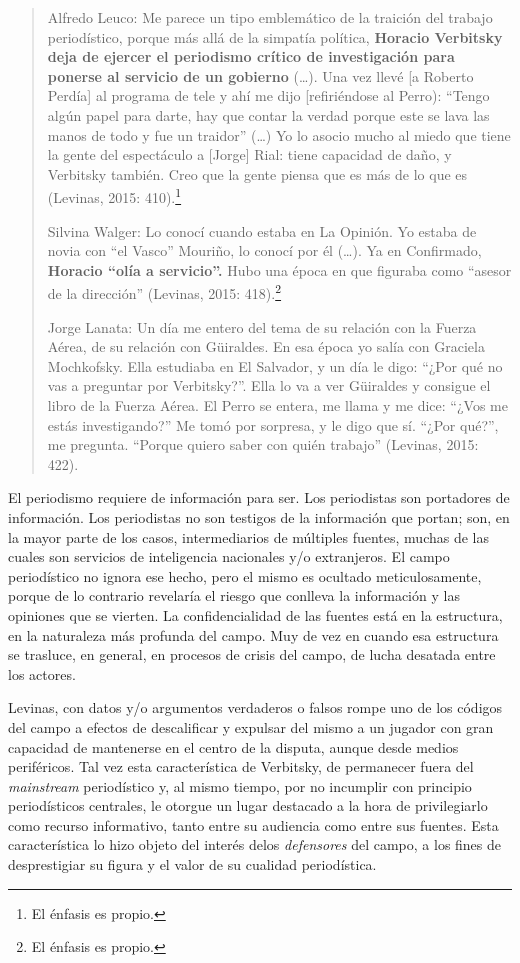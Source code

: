\begin{quote}
Alfredo Leuco: Me parece un tipo emblemático de la traición del trabajo periodístico, porque más allá de la simpatía política, \textbf{Horacio Verbitsky deja de ejercer el periodismo crítico de investigación para ponerse al servicio de un gobierno} (\ldots). Una vez llevé {[}a Roberto Perdía{]} al programa de tele y ahí me dijo {[}refiriéndose al Perro): \enquote{Tengo algún papel para darte, hay que contar la verdad porque este se lava las manos de todo y fue un traidor} (\ldots) Yo lo asocio mucho al miedo que tiene la gente del espectáculo a {[}Jorge{]} Rial: tiene capacidad de daño, y Verbitsky también. Creo que la gente piensa que es más de lo que es (Levinas, 2015: 410).\footnote{El énfasis es propio.}

Silvina Walger: Lo conocí cuando estaba en La Opinión. Yo estaba de novia con \enquote{el Vasco} Mouriño, lo conocí por él (\ldots). Ya en Confirmado, \textbf{Horacio \enquote{olía a servicio}.} Hubo una época en que figuraba como \enquote{asesor de la dirección} (Levinas, 2015: 418).\footnote{El énfasis es propio.}

Jorge Lanata: Un día me entero del tema de su relación con la Fuerza Aérea, de su relación con Güiraldes. En esa época yo salía con Graciela Mochkofsky. Ella estudiaba en El Salvador, y un día le digo: \enquote{¿Por qué no vas a preguntar por Verbitsky?}. Ella lo va a ver Güiraldes y consigue el libro de la Fuerza Aérea. El Perro se entera, me llama y me dice: \enquote{¿Vos me estás investigando?} Me tomó por sorpresa, y le digo que sí. \enquote{¿Por qué?}, me pregunta. \enquote{Porque quiero saber con quién trabajo} (Levinas, 2015: 422).
\end{quote}

El periodismo requiere de información para ser. Los periodistas son portadores de información. Los periodistas no son testigos de la información que portan; son, en la mayor parte de los casos, intermediarios de múltiples fuentes, muchas de las cuales son servicios de inteligencia nacionales y/o extranjeros. El campo periodístico no ignora ese hecho, pero el mismo es ocultado meticulosamente, porque de lo contrario revelaría el riesgo que conlleva la información y las opiniones que se vierten. La confidencialidad de las fuentes está en la estructura, en la naturaleza más profunda del campo. Muy de vez en cuando esa estructura se trasluce, en general, en procesos de crisis del campo, de lucha desatada entre los actores.

Levinas, con datos y/o argumentos verdaderos o falsos rompe uno de los códigos del campo a efectos de descalificar y expulsar del mismo a un jugador con gran capacidad de mantenerse en el centro de la disputa, aunque desde medios periféricos. Tal vez esta característica de Verbitsky, de permanecer fuera del \emph{mainstream} periodístico y, al mismo tiempo, por no incumplir con principio periodísticos centrales, le otorgue un lugar destacado a la hora de privilegiarlo como recurso informativo, tanto entre su audiencia como entre sus fuentes. Esta característica lo hizo objeto del interés delos \emph{defensores} del campo, a los fines de desprestigiar su figura y el valor de su cualidad periodística.

